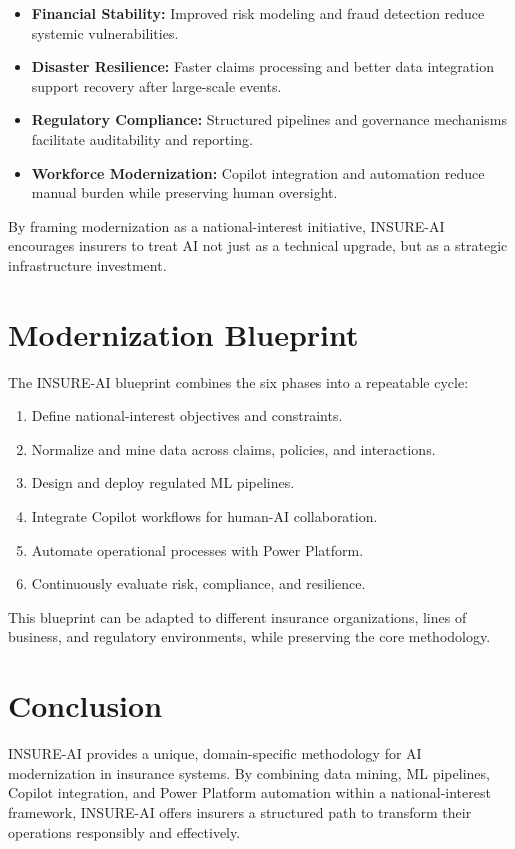 \documentclass{article}
\begin{document}
\begin{itemize}
    \item \textbf{Financial Stability:} Improved risk modeling and fraud detection reduce systemic vulnerabilities.
    \item \textbf{Disaster Resilience:} Faster claims processing and better data integration support recovery after large-scale events.
    \item \textbf{Regulatory Compliance:} Structured pipelines and governance mechanisms facilitate auditability and reporting.
    \item \textbf{Workforce Modernization:} Copilot integration and automation reduce manual burden while preserving human oversight.
\end{itemize}

By framing modernization as a national-interest initiative, INSURE-AI encourages insurers to treat AI not just as a technical upgrade, but as a strategic infrastructure investment.

\section{Modernization Blueprint}
The INSURE-AI blueprint combines the six phases into a repeatable cycle:

\begin{enumerate}
    \item Define national-interest objectives and constraints.
    \item Normalize and mine data across claims, policies, and interactions.
    \item Design and deploy regulated ML pipelines.
    \item Integrate Copilot workflows for human-AI collaboration.
    \item Automate operational processes with Power Platform.
    \item Continuously evaluate risk, compliance, and resilience.
\end{enumerate}

This blueprint can be adapted to different insurance organizations, lines of business, and regulatory environments, while preserving the core methodology.

\section{Conclusion}
INSURE-AI provides a unique, domain-specific methodology for AI modernization in insurance systems. By combining data mining, ML pipelines, Copilot integration, and Power Platform automation within a national-interest framework, INSURE-AI offers insurers a structured path to transform their operations responsibly and effectively.
\end{document}
